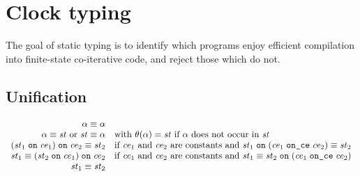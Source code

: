 \section{Clock typing}

The goal of static typing is to identify which programs enjoy efficient
compilation into finite-state co-iterative code, and reject those which do not.

\subsection{Unification}

\[
\begin{array}{rl}
  \Unif{\alpha}{\alpha} & \\
  \Unif{\alpha}{\st} \mbox{ or } \Unif{\st}{\alpha} &
  \mbox{with } \theta(\alpha) = \st \mbox{ if } \alpha \mbox{ does not occur in } \st

  \\

  \Unif{\On{(\On{\st_1}{\ce_1})}{\ce_2}}{\st_2} &
  \mbox{if } \ce_1 \mbox{ and } \ce_2 \mbox{ are constants and }
  \Unif{\On{\st_1}{(\OnCe{\ce_1}{\ce_2})}}{\st_2}
  \\
  \Unif{\st_1}{\On{(\On{\st_2}{\ce_1})}{\ce_2}} &
  \mbox{if } \ce_1 \mbox{ and } \ce_2 \mbox{ are constants and }
  \Unif{\st_1}{\On{\st_2}{(\OnCe{\ce_1}{\ce_2})}}

  \\

  \Unif{\st_1}{\st_2}
  &
  

\end{array}
\]